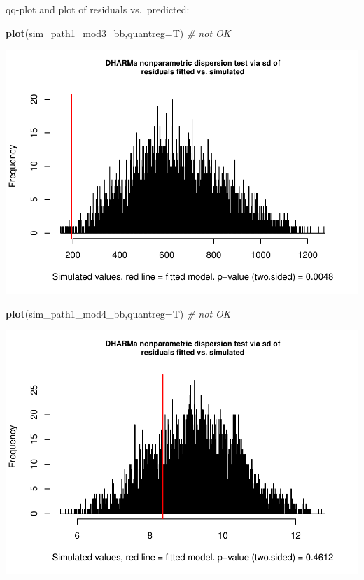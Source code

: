 \documentclass[
]{article}
\newenvironment{Shaded}{\begin{snugshade}}{\end{snugshade}}
\newcommand{\CommentTok}[1]{\textcolor[rgb]{0.56,0.35,0.01}{\textit{#1}}}
\newcommand{\DataTypeTok}[1]{\textcolor[rgb]{0.13,0.29,0.53}{#1}}
\newcommand{\KeywordTok}[1]{\textcolor[rgb]{0.13,0.29,0.53}{\textbf{#1}}}
\newcommand{\NormalTok}[1]{#1}
\begin{document}
qq-plot and plot of residuals vs.~predicted:

\begin{Shaded}
\begin{Highlighting}[]
\KeywordTok{plot}\NormalTok{(sim\_path1\_mod3\_bb,}\DataTypeTok{quantreg=}\NormalTok{T) }\CommentTok{\# not OK }
\end{Highlighting}
\end{Shaded}

\includegraphics{lathyrus_ms3_3_after_rev_Ecology_files/figure-latex/unnamed-chunk-14-1.pdf}

\begin{Shaded}
\begin{Highlighting}[]
\KeywordTok{plot}\NormalTok{(sim\_path1\_mod4\_bb,}\DataTypeTok{quantreg=}\NormalTok{T) }\CommentTok{\# not OK}
\end{Highlighting}
\end{Shaded}

\includegraphics{lathyrus_ms3_3_after_rev_Ecology_files/figure-latex/unnamed-chunk-14-2.pdf}
\end{document}

